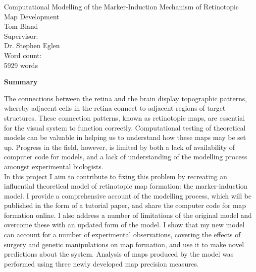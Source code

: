 \documentclass[11pt]{"article"}
\begin{document}
\begin{titlepage}
\centering
{\huge Computational Modelling of the Marker-Induction Mechanism of Retinotopic Map Development\\}
\vspace{1cm}
{\Large Tom Bland\\}
\vspace{2cm}
Supervisor:\\
Dr. Stephen Eglen\\
\vspace{2cm}
Word count:\\
5929 words
\end{titlepage}


\newpage
\thispagestyle{empty}
\mbox{}

\pagebreak

\setcounter{page}{1}

\begin{Large}
\textbf{Summary}\\
\end{Large}

The connections between the retina and the brain display topographic patterns, whereby adjacent cells in the retina connect to adjacent regions of target structures. These connection patterns, known as retinotopic maps, are essential for the visual system to function correctly. Computational testing of theoretical models can be valuable in helping us to understand how these maps may be set up. Progress in the field, however, is limited by both a lack of availability of computer code for models, and a lack of understanding of the modelling process amongst experimental biologists. \\

In this project I aim to contribute to fixing this problem by recreating an influential theoretical model of retinotopic map formation: the marker-induction model. I provide a comprehensive account of the modelling process, which will be published in the form of a tutorial paper, and share the computer code for map formation online. I also address a number of limitations of the original model and overcome these with an updated form of the model. I show that my new model can account for a number of experimental observations, covering the effects of surgery and genetic manipulations on map formation, and use it to make novel predictions about the system. Analysis of maps produced by the model was performed using three newly developed map precision measures.


\tableofcontents
\end{document}
